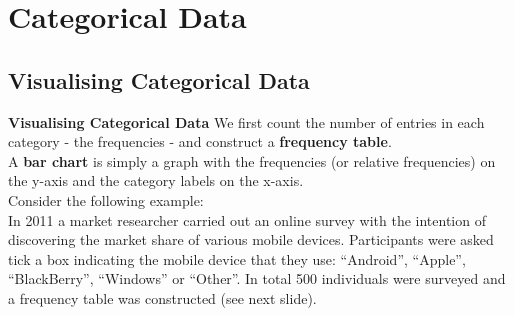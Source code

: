\documentclass[compress]{beamer}        %
\makeatletter
\newcommand{\tcb}{\textcolor{beamer@blendedblue}}
\makeatother
\begin{document}
\section{Categorical Data}
\subsection{Visualising Categorical Data}
\begin{frame}{\bf \tcb{Visualising Categorical Data}}
We first count the number of entries in each category - the frequencies - and construct a {\bf frequency table}.\\[0.4cm]
A {\bf bar chart} is simply a graph with the frequencies (or relative frequencies) on the y-axis and the category labels on the x-axis.\\[0.6cm]
Consider the following example:\\[0.2cm]
In 2011 a market researcher carried out an online survey with the intention of discovering the market share of various mobile devices. Participants were asked tick a box indicating the mobile device that they use: ``Android'', ``Apple'', ``BlackBerry'', ``Windows'' or ``Other''. In total 500 individuals were surveyed and a frequency table was constructed (see next slide).

\end{frame}
\end{document}
